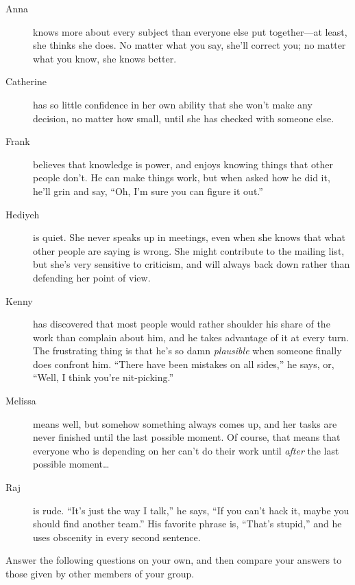\begin{description}

\item[Anna] knows more about every subject than everyone else put
  together---at least, she thinks she does. No matter what you say,
  she'll correct you; no matter what you know, she knows better.

\item[Catherine] has so little confidence in her own ability that she
  won't make any decision, no matter how small, until she has checked
  with someone else.

\item[Frank] believes that knowledge is power, and enjoys knowing
  things that other people don't. He can make things work, but when
  asked how he did it, he'll grin and say, ``Oh, I'm sure you can
  figure it out.''

\item[Hediyeh] is quiet. She never speaks up in meetings, even when
  she knows that what other people are saying is wrong. She might
  contribute to the mailing list, but she's very sensitive to
  criticism, and will always back down rather than defending her point
  of view.

\item[Kenny] has discovered that most people would rather shoulder his
  share of the work than complain about him, and he takes advantage of
  it at every turn. The frustrating thing is that he's so damn
  \emph{plausible} when someone finally does confront him. ``There
  have been mistakes on all sides,'' he says, or, ``Well, I think
  you're nit-picking.''

\item[Melissa] means well, but somehow something always comes up, and
  her tasks are never finished until the last possible moment. Of
  course, that means that everyone who is depending on her can't do
  their work until \emph{after} the last possible moment{\ldots}

\item[Raj] is rude. ``It's just the way I talk,'' he says, ``If you
  can't hack it, maybe you should find another team.'' His favorite
  phrase is, ``That's stupid,'' and he uses obscenity in every second
  sentence.

\end{description}


Answer the following questions on your own, and then compare your
answers to those given by other members of your group.

